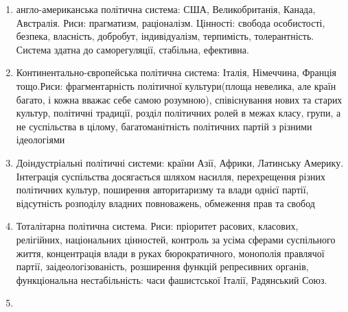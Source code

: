  \begin{enumerate}
 \item англо-американська політична система: США, Великобританія, Канада, Австралія. Риси: прагматизм, раціоналізм. Цінності: свобода особистості, безпека, власність, добробут, індивідуалізм, терпимість, толерантність. Система здатна до саморегуляції, стабільна, ефективна.
 \item Континентально-європейська політична система: Італія, Німеччина, Франція тощо.Риси: фрагментарність політичної культури(площа невелика, але країн багато, і кожна вважає себе самою розумною), співіснування нових та старих культур, політичні традиції, розділ політичних ролей в межах класу, групи, а не суспільства в цілому, багатоманітність політичних партій з різними ідеологіями
 \item Доіндустріальні політичні системи: країни Азії, Африки, Латинську Америку. Інтеграція суспільства досягається шляхом насилля, перехрещення різних політичних культур, поширення авторитаризму та влади однієї партії, відсутність розподілу владних повноважень, обмеження прав та свобод
 \item Тоталітарна політична система. Риси: пріоритет расових, класових, релігійних, національних цінностей, контроль за усіма сферами суспільного життя, концентрація влади в руках бюрократичного, монополія правлячої партії, заідеологізованість, розширення функцій репресивних органів, функціональна нестабільність: часи фашистської Італії, Радянський Союз.
 \item  
 \end{enumerate}  
